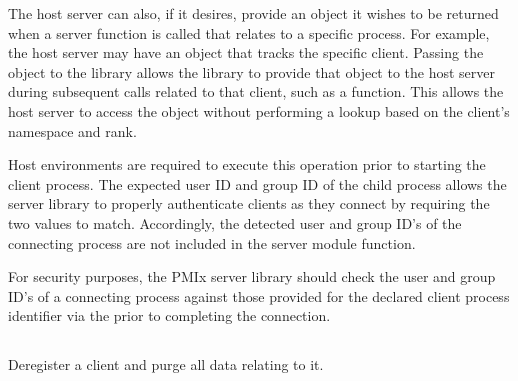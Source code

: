 The host server can also, if it desires, provide an object it wishes to be returned when a server function is called that relates to a specific process.
For example, the host server may have an object that tracks the specific client.
Passing the object to the library allows the library to provide that object to the host server during subsequent calls related to that client, such as a  function.  This allows the host server to access the object without performing a lookup based on the client's namespace and rank.

\advicermstart
Host environments are required to execute this operation prior to starting the client process.
The expected user ID and group ID of the child process allows the server library to properly authenticate clients as they connect by requiring the two values to match. Accordingly, the detected user and group ID's of the connecting process are not included in the  server module function.
\advicermend

\adviceimplstart
For security purposes, the \ac{PMIx} server library should check the user and group ID's of a connecting process against those provided for the declared client process identifier via the  prior to completing the connection.
\adviceimplend


\subsection{}

\summary

Deregister a client and purge all data relating to it.

\format


\begin{arglist}
\end{arglist}


